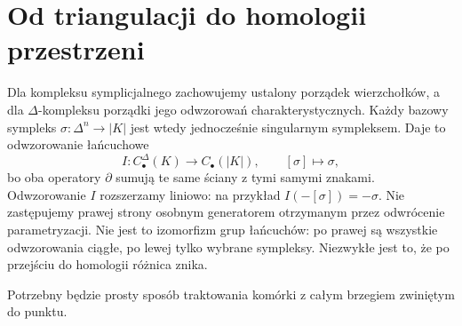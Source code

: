 \section{Od triangulacji do homologii przestrzeni}
\label{sec:porownanie-symplicjalne}

Dla kompleksu symplicjalnego zachowujemy ustalony porządek
wierzchołków, a dla $\Delta$-kompleksu porządki jego odwzorowań charakterystycznych.
Każdy bazowy sympleks $\sigma:\Delta^n\to|K|$ jest wtedy
jednocześnie singularnym sympleksem. Daje to odwzorowanie łańcuchowe
\[
 I:C_\bullet^\Delta(K)\longrightarrow C_\bullet(|K|),
 \qquad [\sigma]\longmapsto \sigma,
\]
bo oba operatory $\partial$ sumują te same
ściany z tymi samymi znakami.
Odwzorowanie $I$ rozszerzamy liniowo: na przykład $I(-[\sigma])=-\sigma$.
Nie zastępujemy prawej strony osobnym generatorem otrzymanym
przez odwrócenie parametryzacji. Nie jest to
izomorfizm grup łańcuchów: po prawej są
wszystkie odwzorowania ciągłe, po lewej tylko
wybrane sympleksy. Niezwykłe jest to,
że po przejściu do homologii różnica znika.

Potrzebny będzie prosty sposób traktowania
komórki z całym brzegiem zwiniętym do punktu.

